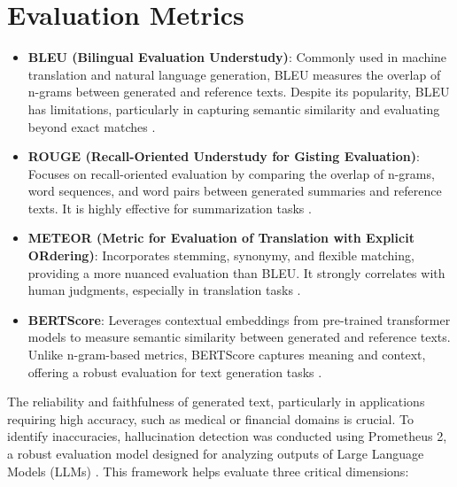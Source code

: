 \clearpage
\appendix
{}


\section{Evaluation Metrics}
\label{sec:evaluation-metrics}


\begin{itemize} 
    \item \textbf{BLEU (Bilingual Evaluation Understudy)}: Commonly used in machine translation and natural language generation, BLEU measures the overlap of n-grams between generated and reference texts. Despite its popularity, BLEU has limitations, particularly in capturing semantic similarity and evaluating beyond exact matches \cite{Reiter2018A}. 
    \item \textbf{ROUGE (Recall-Oriented Understudy for Gisting Evaluation)}: Focuses on recall-oriented evaluation by comparing the overlap of n-grams, word sequences, and word pairs between generated summaries and reference texts. It is highly effective for summarization tasks \cite{Ganesan2015ROUGE}.
    \item \textbf{METEOR (Metric for Evaluation of Translation with Explicit ORdering)}: Incorporates stemming, synonymy, and flexible matching, providing a more nuanced evaluation than BLEU. It strongly correlates with human judgments, especially in translation tasks \cite{Dobre2015ACB}. 
    \item \textbf{BERTScore}: Leverages contextual embeddings from pre-trained transformer models to measure semantic similarity between generated and reference texts. Unlike n-gram-based metrics, BERTScore captures meaning and context, offering a robust evaluation for text generation tasks \cite{zhang2020bertscoreevaluatingtextgeneration}.
\end{itemize}

The reliability and faithfulness of generated text, particularly in applications requiring high accuracy, such as medical or financial domains is crucial. To identify inaccuracies, hallucination detection was conducted using Prometheus 2, a robust evaluation model designed for analyzing outputs of Large Language Models (LLMs) \cite{kim2024prometheus2opensource}. This framework helps evaluate three critical dimensions: 


